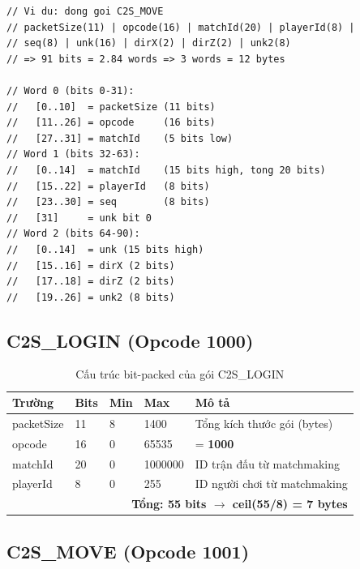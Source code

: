\documentclass[12pt,a4paper]{report}
\begin{document}
\begin{lstlisting}[style=cppStyle, caption={Minh họa cách bits được đóng gói vào words 32-bit}, label={lst:bitpackex}]
// Vi du: dong goi C2S_MOVE
// packetSize(11) | opcode(16) | matchId(20) | playerId(8) |
// seq(8) | unk(16) | dirX(2) | dirZ(2) | unk2(8)
// => 91 bits = 2.84 words => 3 words = 12 bytes

// Word 0 (bits 0-31):
//   [0..10]  = packetSize (11 bits)
//   [11..26] = opcode     (16 bits)
//   [27..31] = matchId    (5 bits low)
// Word 1 (bits 32-63):
//   [0..14]  = matchId    (15 bits high, tong 20 bits)
//   [15..22] = playerId   (8 bits)
//   [23..30] = seq        (8 bits)
//   [31]     = unk bit 0
// Word 2 (bits 64-90):
//   [0..14]  = unk (15 bits high)
//   [15..16] = dirX (2 bits)
//   [17..18] = dirZ (2 bits)
//   [19..26] = unk2 (8 bits)
\end{lstlisting}

\subsection{C2S\_LOGIN (Opcode 1000)}

\begin{table}[H]
\centering
\caption{Cấu trúc bit-packed của gói C2S\_LOGIN}
\label{tab:c2slogin}
\begin{tabular}{lllll}
\toprule
\textbf{Trường} & \textbf{Bits} & \textbf{Min} & \textbf{Max} & \textbf{Mô tả} \\
\midrule
packetSize & 11 & 8      & 1400    & Tổng kích thước gói (bytes) \\
opcode     & 16 & 0      & 65535   & = \textbf{1000} \\
matchId    & 20 & 0      & 1000000 & ID trận đấu từ matchmaking \\
playerId   &  8 & 0      & 255     & ID người chơi từ matchmaking \\
\midrule
\multicolumn{5}{r}{\textbf{Tổng: 55 bits $\rightarrow$ ceil(55/8) = 7 bytes}} \\
\bottomrule
\end{tabular}
\end{table}

\subsection{C2S\_MOVE (Opcode 1001)}
\end{document}
